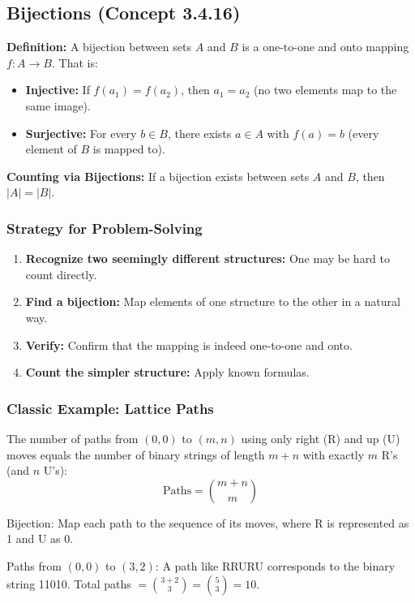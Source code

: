 \documentclass[12pt]{extarticle}
\begin{document}
\subsection{Bijections (Concept 3.4.16)}

\textbf{Definition:} A bijection between sets $A$ and $B$ is a one-to-one and onto mapping $f: A \to B$. That is:
\begin{itemize}
    \item \textbf{Injective:} If $f(a_1) = f(a_2)$, then $a_1 = a_2$ (no two elements map to the same image).
    \item \textbf{Surjective:} For every $b \in B$, there exists $a \in A$ with $f(a) = b$ (every element of $B$ is mapped to).
\end{itemize}

\textbf{Counting via Bijections:} If a bijection exists between sets $A$ and $B$, then $|A| = |B|$.

\subsubsection{Strategy for Problem-Solving}

\begin{enumerate}
    \item \textbf{Recognize two seemingly different structures:} One may be hard to count directly.
    \item \textbf{Find a bijection:} Map elements of one structure to the other in a natural way.
    \item \textbf{Verify:} Confirm that the mapping is indeed one-to-one and onto.
    \item \textbf{Count the simpler structure:} Apply known formulas.
\end{enumerate}

\subsubsection{Classic Example: Lattice Paths}

The number of paths from $(0,0)$ to $(m,n)$ using only right (R) and up (U) moves equals the number of binary strings of length $m+n$ with exactly $m$ R's (and $n$ U's):
\[
\text{Paths} = \binom{m+n}{m}
\]

Bijection: Map each path to the sequence of its moves, where R is represented as 1 and U as 0.

\begin{examplebox}
Paths from $(0,0)$ to $(3,2)$: A path like RRURU corresponds to the binary string 11010. Total paths $= \binom{3+2}{3} = \binom{5}{3} = 10$.
\end{examplebox}
\end{document}
